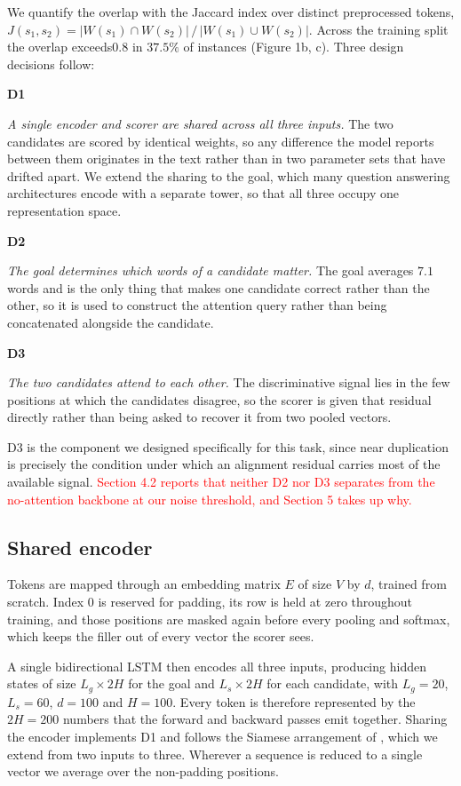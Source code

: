 \documentclass[11pt]{article}
\begin{document}
We quantify the overlap with the Jaccard index over distinct preprocessed tokens, $J({s}_{1},{s}_{2})=|W({s}_{1})\cap W({s}_{2})|\,/\,|W({s}_{1})\cup W({s}_{2})|$. Across the training split the overlap exceeds$0.8$ in $37.5\%$ of instances (Figure 1b, c). Three design decisions follow:

\textbf{D1}

\textit{A single encoder and scorer are shared across all three inputs.} The two candidates are scored by identical weights, so any difference the model reports between them originates in the text rather than in two parameter sets that have drifted apart. We extend the sharing to the goal, which many question answering architectures encode with a separate tower, so that all three occupy one representation space.

\textbf{D2}

\textit{The goal determines which words of a candidate matter.} The goal averages $7.1$ words and is the only thing that makes one candidate correct rather than the other, so it is used to construct the attention query rather than being concatenated alongside the candidate.

\textbf{D3}

\textit{The two candidates attend to each other.} The discriminative signal lies in the few positions at which the candidates disagree, so the scorer is given that residual directly rather than being asked to recover it from two pooled vectors.

D3 is the component we designed specifically for this task, since near duplication is precisely the condition under which an alignment residual carries most of the available signal. \textcolor{red}{Section 4.2 reports that neither D2 nor D3 separates from the no-attention backbone at our noise threshold, and Section 5 takes up why.}

\subsection{Shared encoder}

Tokens are mapped through an embedding matrix $E$ of size $V$ by $d$, trained from scratch. Index $0$ is reserved for padding, its row is held at zero throughout training, and those positions are masked again before every pooling and softmax, which keeps the filler out of every vector the scorer sees.

A single bidirectional LSTM \citep{hochreiter1997long} then encodes all three inputs, producing hidden states of size ${L}_{g}\times 2H$ for the goal and ${L}_{s}\times 2H$ for each candidate, with ${L}_{g}=20$, ${L}_{s}=60$, $d=100$ and $H=100$. Every token is therefore represented by the $2H=200$ numbers that the forward and backward passes emit together. Sharing the encoder implements D1 and follows the Siamese arrangement of \citet{mueller2016siamese}, which we extend from two inputs to three. Wherever a sequence is reduced to a single vector we average over the non-padding positions.
\end{document}
